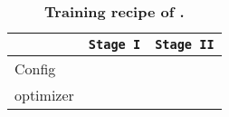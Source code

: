 \begin{table}[ht!]
\caption{\textbf{Training recipe of \ours.} 
}
\label{table:training_recipe}
\centering
\renewcommand{\arraystretch}{1.3} %
\begin{tabular}{l c c}
 & \texttt{Stage I} & \texttt{Stage II}\\
\toprule[0.95pt]
Config &  & \\
optimizer \\
\bottomrule[0.95pt]
\end{tabular}
\end{table}